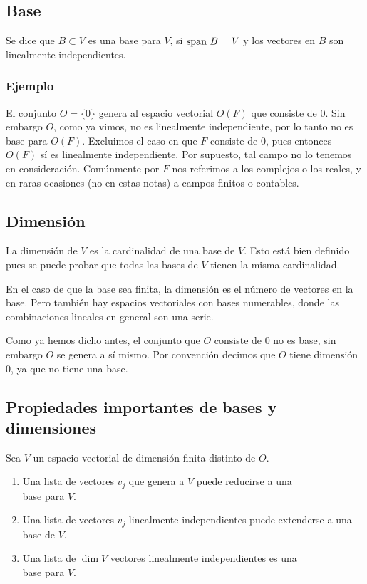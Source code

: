 \documentclass{article}
\begin{document}
\subsection{Base}
Se dice que $B\subset V$ es una base para $V$, si
$\text{span } B = V$ y los vectores en $B$ son linealmente
independientes.

\subsubsection*{Ejemplo}
El conjunto $O=\{0\}$ genera al espacio vectorial $O(F)$
que consiste de $0$. Sin embargo $O$, como ya vimos, no es linealmente independiente,
por lo tanto no es base para $O(F)$.
Excluimos el caso en que $F$ consiste de $0$, pues entonces $O(F)$ sí es linealmente independiente.
Por supuesto, tal campo no lo tenemos en consideración. Comúnmente por $F$ nos referimos
a los complejos o los reales, y en raras ocasiones (no en estas notas)
a campos finitos o contables.

\subsection{Dimensión}
La dimensión de $V$ es la cardinalidad de una base de $V$.
Esto está bien definido pues se puede probar que todas las bases de
$V$ tienen la misma cardinalidad. 

En el caso de que la base sea
finita, la dimensión es el número de vectores en la base. Pero
también hay espacios vectoriales con bases numerables, 
donde las combinaciones lineales en general son una serie.

Como ya hemos dicho antes, el conjunto que $O$ consiste de $0$ no es base, sin embargo $O$ se genera a sí mismo. Por convención decimos que $O$ tiene dimensión $0$, ya que no tiene una base.
\newpage

\subsection{Propiedades importantes de bases y dimensiones}
\label{bases}
Sea $V$ un espacio vectorial de dimensión finita distinto de $O$.
\begin{enumerate}
    \item Una lista de vectores $v_j$ que genera a $V$ puede
    reducirse a una\\
    base para $V$.
    \item Una lista de vectores $v_j$ linealmente independientes 
    puede extenderse a una base de $V$.
    \item Una lista de $\dim V$ vectores linealmente independientes es una\\
    base para $V$.
\end{enumerate}
\end{document}
